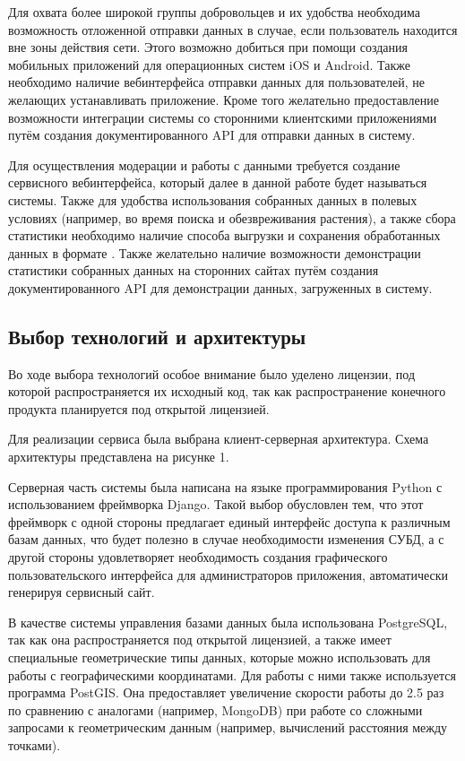 \nwln
Для охвата более широкой группы добровольцев и их удобства необходима возможность отложенной отправки данных в случае, если пользователь находится вне зоны действия сети.
Этого возможно добиться при помощи создания мобильных приложений для операционных систем iOS и Android.
Также необходимо наличие вебинтерфейса отправки данных для пользователей, не желающих устанавливать приложение.
Кроме того желательно предоставление возможности интеграции системы со сторонними клиентскими приложениями путём создания документированного API для отправки данных в систему.

\nwln
Для осуществления модерации и работы с данными требуется создание сервисного вебинтерфейса, который далее в данной работе будет называться  системы.
Также для удобства использования собранных данных в полевых условиях (например, во время поиска и обезвреживания растения), а также сбора статистики необходимо наличие способа выгрузки и сохранения обработанных данных в формате .
Также желательно наличие возможности демонстрации статистики собранных данных на сторонних сайтах путём создания документированного API для демонстрации данных, загруженных в систему. \\

\subsection{Выбор технологий и архитектуры}

\tab
Во ходе выбора технологий особое внимание было уделено лицензии, под которой распространяется их исходный код, так как распространение конечного продукта планируется под открытой лицензией.

\nwln
Для реализации сервиса была выбрана клиент-серверная архитектура. Схема архитектуры представлена на рисунке 1. \\
\pictureone

\tab
Серверная часть системы была написана на языке программирования Python с использованием фреймворка Django.
Такой выбор обусловлен тем, что этот фреймворк с одной стороны предлагает единый интерфейс доступа к различным базам данных, что будет полезно в случае необходимости изменения СУБД, а с другой стороны удовлетворяет необходимость создания графического пользовательского интерфейса для администраторов приложения, автоматически генерируя сервисный сайт.

\nwln
В качестве системы управления базами данных была использована PostgreSQL, так как она распространяется под открытой лицензией, а также имеет специальные геометрические типы данных, которые можно использовать для работы с географическими координатами.
Для работы с ними также используется программа PostGIS.
Она предоставляет увеличение скорости работы до 2.5 раз по сравнению с аналогами (например, MongoDB) при работе со сложными запросами к геометрическим данным (например, вычислений расстояния между точками)\cite{postgis-vs-mongo}.

